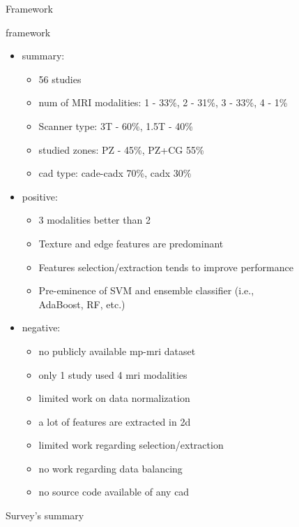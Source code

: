 \documentclass[num-refs]{wiley-article}
\begin{document}

\begin{figure}
Framework
\caption{framework}
\label{fig:wkfcad}  
\end{figure}

\begin{figure}
\begin{itemize} 
\item summary: 
  \begin{itemize} 
    \item 56 studies
    \item num of MRI modalities: 1 - 33\%, 2 - 31\%, 3 - 33\%, 4 - 1\%
    \item Scanner type: 3T - 60\%, 1.5T - 40\%
    \item studied zones: PZ - 45\%, PZ+CG 55\%
    \item cad type: cade-cadx 70\%, cadx 30\%
  \end{itemize}
\item positive:
  \begin{itemize} 
    \item 3 modalities better than 2
    \item Texture and edge features are predominant
    \item Features selection/extraction tends to improve performance
    \item Pre-eminence of SVM and ensemble classifier (i.e., AdaBoost, RF, etc.)
  \end{itemize}
\item negative:
  \begin{itemize} 
    \item no publicly available mp-mri dataset
    \item only 1 study used 4 mri modalities
    \item limited work on data normalization
    \item a lot of features are extracted in 2d
    \item limited work regarding selection/extraction
    \item no work regarding data balancing
    \item no source code available of any cad
  \end{itemize}
\end{itemize}
\caption{Survey's summary}
\label{tab:survey-summary}
\end{figure}
\end{document}
